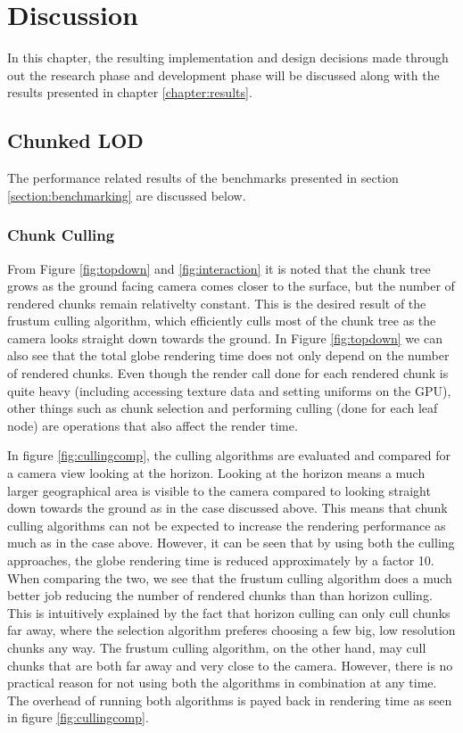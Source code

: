 \chapter{Discussion}
In this chapter, the resulting implementation and design decisions made through out the research phase and development phase will be discussed along with the results presented in chapter \ref{chapter:results}.

\section{Chunked LOD}
The performance related results of the benchmarks presented in section \ref{section:benchmarking} are discussed below.

\subsection{Chunk Culling}
From Figure \ref{fig:topdown} and \ref{fig:interaction} it is noted that the chunk tree grows as the ground facing camera comes closer to the surface, but the number of rendered chunks remain relativelty constant. 
This is the desired result of the frustum culling algorithm, which efficiently culls most of the chunk tree as the camera looks straight down towards the ground. 
In Figure \ref{fig:topdown} we can also see that the total globe rendering time does not only depend on the number of rendered chunks. 
Even though the render call done for each rendered chunk is quite heavy (including accessing texture data and setting uniforms on the GPU), other things such as chunk selection and performing culling (done for each leaf node) are operations that also affect the render time. 

In figure \ref{fig:cullingcomp}, the culling algorithms are evaluated and compared for a camera view looking at the horizon. 
Looking at the horizon means a much larger geographical area is visible to the camera compared to looking straight down towards the ground as in the case discussed above. 
This means that chunk culling algorithms can not be expected to increase the rendering performance as much as in the case above. 
However, it can be seen that by using both the culling approaches, the globe rendering time is reduced approximately by a factor 10. 
When comparing the two, we see that the frustum culling algorithm does a much better job reducing the number of rendered chunks than than horizon culling. 
This is intuitively explained by the fact that horizon culling can only cull chunks far away, where the selection algorithm preferes choosing a few big, low resolution chunks any way. 
The frustum culling algorithm, on the other hand, may cull chunks that are both far away and very close to the camera. 
However, there is no practical reason for not using both the algorithms in combination at any time. 
The overhead of running both algorithms is payed back in rendering time as seen in figure \ref{fig:cullingcomp}.

